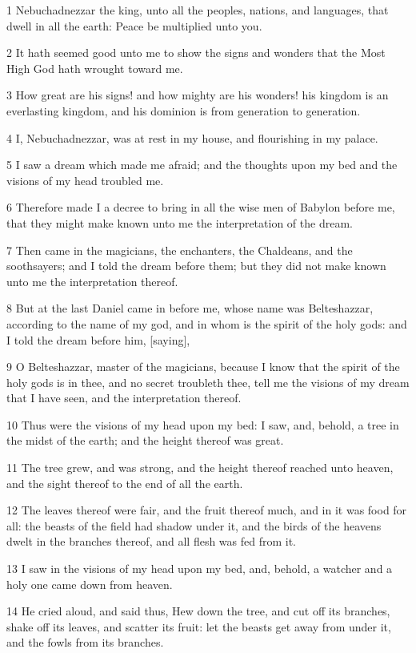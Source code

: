 \par 1 Nebuchadnezzar the king, unto all the peoples, nations, and languages, that dwell in all the earth: Peace be multiplied unto you.
\par 2 It hath seemed good unto me to show the signs and wonders that the Most High God hath wrought toward me.
\par 3 How great are his signs! and how mighty are his wonders! his kingdom is an everlasting kingdom, and his dominion is from generation to generation.
\par 4 I, Nebuchadnezzar, was at rest in my house, and flourishing in my palace.
\par 5 I saw a dream which made me afraid; and the thoughts upon my bed and the visions of my head troubled me.
\par 6 Therefore made I a decree to bring in all the wise men of Babylon before me, that they might make known unto me the interpretation of the dream.
\par 7 Then came in the magicians, the enchanters, the Chaldeans, and the soothsayers; and I told the dream before them; but they did not make known unto me the interpretation thereof.
\par 8 But at the last Daniel came in before me, whose name was Belteshazzar, according to the name of my god, and in whom is the spirit of the holy gods: and I told the dream before him, [saying],
\par 9 O Belteshazzar, master of the magicians, because I know that the spirit of the holy gods is in thee, and no secret troubleth thee, tell me the visions of my dream that I have seen, and the interpretation thereof.
\par 10 Thus were the visions of my head upon my bed: I saw, and, behold, a tree in the midst of the earth; and the height thereof was great.
\par 11 The tree grew, and was strong, and the height thereof reached unto heaven, and the sight thereof to the end of all the earth.
\par 12 The leaves thereof were fair, and the fruit thereof much, and in it was food for all: the beasts of the field had shadow under it, and the birds of the heavens dwelt in the branches thereof, and all flesh was fed from it.
\par 13 I saw in the visions of my head upon my bed, and, behold, a watcher and a holy one came down from heaven.
\par 14 He cried aloud, and said thus, Hew down the tree, and cut off its branches, shake off its leaves, and scatter its fruit: let the beasts get away from under it, and the fowls from its branches.
